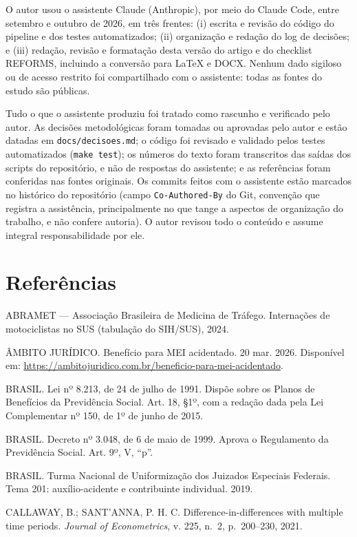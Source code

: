 \documentclass[
  11pt,
]{article}
\begin{document}
O autor usou o assistente Claude (Anthropic), por meio do Claude Code, entre setembro e outubro de 2026, em três frentes: (i) escrita e revisão do código do pipeline e dos testes automatizados; (ii) organização e redação do log de decisões; e (iii) redação, revisão e formatação desta versão do artigo e do checklist REFORMS, incluindo a conversão para LaTeX e DOCX. Nenhum dado sigiloso ou de acesso restrito foi compartilhado com o assistente: todas as fontes do estudo são públicas.

Tudo o que o assistente produziu foi tratado como rascunho e verificado pelo autor. As decisões metodológicas foram tomadas ou aprovadas pelo autor e estão datadas em \texttt{docs/decisoes.md}; o código foi revisado e validado pelos testes automatizados (\texttt{make test}); os números do texto foram transcritos das saídas dos scripts do repositório, e não de respostas do assistente; e as referências foram conferidas nas fontes originais. Os commits feitos com o assistente estão marcados no histórico do repositório (campo \texttt{Co-Authored-By} do Git, convenção que registra a assistência, principalmente no que tange a aspectos de organização do trabalho, e não confere autoria). O autor revisou todo o conteúdo e assume integral responsabilidade por ele.

\hypertarget{referuxeancias}{%
\section{Referências}\label{referuxeancias}}

ABRAMET --- Associação Brasileira de Medicina de Tráfego. Internações de motociclistas no SUS (tabulação do SIH/SUS), 2024.

ÂMBITO JURÍDICO. Benefício para MEI acidentado. 20 mar. 2026. Disponível em: \url{https://ambitojuridico.com.br/beneficio-para-mei-acidentado}.

BRASIL. Lei nº 8.213, de 24 de julho de 1991. Dispõe sobre os Planos de Benefícios da Previdência Social. Art. 18, §1º, com a redação dada pela Lei Complementar nº 150, de 1º de junho de 2015.

BRASIL. Decreto nº 3.048, de 6 de maio de 1999. Aprova o Regulamento da Previdência Social. Art. 9º, V, ``p''.

BRASIL. Turma Nacional de Uniformização dos Juizados Especiais Federais. Tema 201: auxílio-acidente e contribuinte individual. 2019.

CALLAWAY, B.; SANT'ANNA, P. H. C. Difference-in-differences with multiple time periods. \emph{Journal of Econometrics}, v. 225, n.~2, p.~200--230, 2021.
\end{document}
